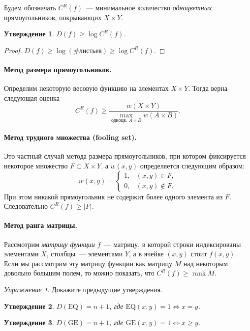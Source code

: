 \documentclass[12pt]{article}
\DeclareMathOperator{\rank}{rank}
\theoremstyle{definition}
\theoremstyle{plain}
\newtheorem{statement}{Утверждение}[section]
\theoremstyle{remark}
\newtheorem{exercise}{Упражнение}[section]
\begin{document}
Будем обозначать $C^R(f)$~--- минимальное количество \emph{одноцветных} прямоугольников, покрывающих $X\times Y$.

\begin{statement}
    $D(f) \ge \log C^R(f)$.
\end{statement}
\begin{proof}
    $D(f) \ge \log (\text{\# листьев}) \ge \log C^R(f)$.
\end{proof}


\paragraph{Метод размера прямоугольников.} Определим некоторую весовую функцию на элементах $X\times Y$.
Тогда верна следующая оценка \[
    C^R(f) \ge \frac{w(X\times Y)}{\max\limits_{\text{одноцв. } A\times B} w(A\times B)}. 
\]


\paragraph{Метод трудного множества (fooling set).} Это частный случай метода размера прямоугольников, 
при котором фиксируется некоторое множество $F\subset X\times Y$, а $w(x,y)$ определяется следующим образом:
\[
    w(x,y) = 
    \begin{cases}
        1, & (x,y)\in F,\\
        0, & (x,y)\not\in F.
    \end{cases}
\]
При этом никакой прямоугольник не содержит более одного элемента из $F$. Следовательно $C^R(f) \ge |F|$.

\paragraph{Метод ранга матрицы.} Рассмотрим \emph{матрицу функции $f$}~--- матрицу, в которой
строки индексированы элементами $X$, столбцы~--- элементами $Y$, а в ячейке $(x,y)$ стоит $f(x,y)$.
Если мы рассмотрим эту матрицу функции как матрицу $M$ над некоторым довольно большим полем, 
то можно показать, что $C^R(f)\ge \rank M$.
\begin{exercise}
    Докажите предыдущие утверждения.
\end{exercise}

\begin{statement}
    $D(\mathrm{EQ}) = n + 1$, где $\mathrm{EQ}(x,y) = 1 \iff x = y$.
\end{statement}

\begin{statement}
    $D(\mathrm{GE}) = n + 1$, где $\mathrm{GE}(x,y) = 1 \iff x \ge y$.
\end{statement}
\end{document}

